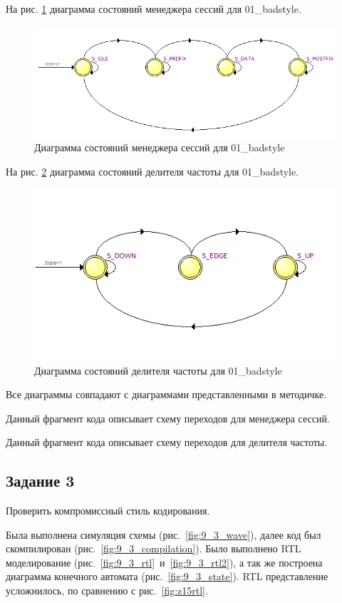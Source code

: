 \documentclass[a4paper,14pt]{article}
\begin{document}
	На рис. \ref{fig:z15auto} диаграмма состояний менеджера сессий для 01\_badstyle.
	
	\begin{figure}[H]
		\centering
		\includegraphics[width=0.6\linewidth]{images/z1_5_auto}
		\caption{Диаграмма состояний менеджера сессий для 01\_badstyle}
		\label{fig:z15auto}
	\end{figure}
	
	На рис. \ref{fig:z15autoclkdivider} диаграмма состояний делителя частоты для 01\_badstyle.
	
	\begin{figure}[H]
		\centering
		\includegraphics[width=0.6\linewidth]{images/z1_5_auto_clk_divider}
		\caption{Диаграмма состояний делителя частоты для 01\_badstyle}
		\label{fig:z15autoclkdivider}
	\end{figure}

	Все диаграммы совпадают с диаграммами представленными в методичке.
	
	Данный фрагмент кода описывает схему переходов для менеджера сессий.
	
	{\small {}}

	Данный фрагмент кода описывает схему переходов для делителя частоты.
	
	{\small {}}
	
	\subsection{Задание 3}
	
	Проверить компромиссный стиль кодирования.
	
	Была выполнена симуляция схемы (рис.~\ref{fig:9_3_wave}), далее код был скомпилирован (рис.~\ref{fig:9_3_compilation}).
	Было выполнено RTL моделирование (рис.~\ref{fig:9_3_rtl}~и~\ref{fig:9_3_rtl2}), а так же построена диаграмма конечного автомата (рис.~\ref{fig:9_3_state}).
	RTL представление усложнилось, по сравнению с рис.~\ref{fig:z15rtl}.
	
\end{document}
